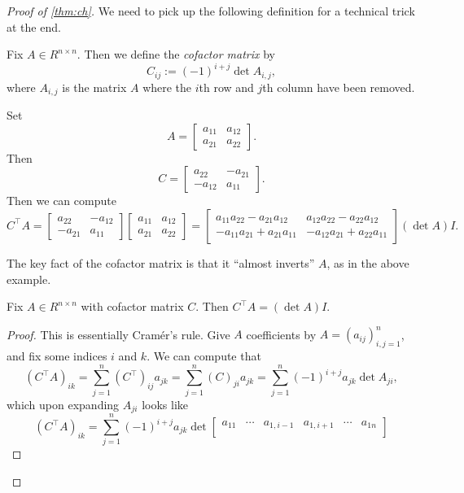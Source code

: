 \begin{proof}[Proof of \autoref{thm:ch}]
	We need to pick up the following definition for a technical trick at the end.
	\begin{definition}
		Fix $A\in R^{n\times n}$. Then we define the \textit{cofactor matrix} by
		\[C_{ij}:=(-1)^{i+j}\det A_{i,j},\]
		where $A_{i,j}$ is the matrix $A$ where the $i$th row and $j$th column have been removed.
	\end{definition}
	\begin{example}
		Set
		\[A=\begin{bmatrix}
			a_{11} & a_{12} \\
			a_{21} & a_{22}
		\end{bmatrix}.\]
		Then
		\[C=\begin{bmatrix}
			a_{22} & -a_{21} \\
			-a_{12} & a_{11}
		\end{bmatrix}.\]
		Then we can compute
		\[C^\intercal A=\begin{bmatrix}
			a_{22} & -a_{12} \\
			-a_{21} & a_{11}
		\end{bmatrix}\begin{bmatrix}
			a_{11} & a_{12} \\
			a_{21} & a_{22}
		\end{bmatrix}=\begin{bmatrix}
			a_{11}a_{22}-a_{21}a_{12} & a_{12}a_{22}-a_{22}a_{12} \\
			-a_{11}a_{21}+a_{21}a_{11} & -a_{12}a_{21}+a_{22}a_{11}
		\end{bmatrix}(\det A)I.\]
	\end{example}
	The key fact of the cofactor matrix is that it ``almost inverts'' $A$, as in the above example.
	\begin{lemma} \label{lem:adjugate}
		Fix $A\in R^{n\times n}$ with cofactor matrix $C$. Then $C^\intercal A=(\det A)I$.
	\end{lemma}
	\begin{proof}
		This is essentially Cram\'er's rule. Give $A$ coefficients by $A=(a_{ij})_{i,j=1}^n$, and fix some indices $i$ and $k$. We can compute that
		\[\left(C^\intercal A\right)_{ik}=\sum_{j=1}^n\left(C^\intercal\right)_{ij}a_{jk}=\sum_{j=1}^n(C)_{ji}a_{jk}=\sum_{j=1}^n(-1)^{i+j}a_{jk}\det A_{ji},\]
		which upon expanding $A_{ji}$ looks like
		\[\left(C^\intercal A\right)_{ik}=\sum_{j=1}^n(-1)^{i+j}a_{jk}\det\begin{bmatrix}
			a_{11} & \cdots & a_{1,i-1} & a_{1,i+1} & \cdots & a_{1n} \\

\end{bmatrix}\]
\end{proof}
\end{proof}
